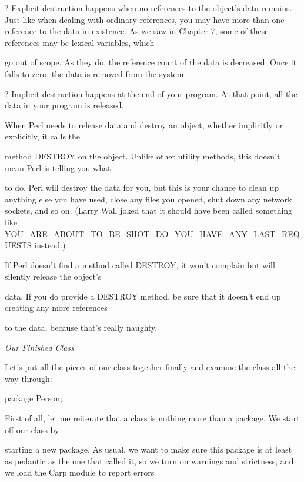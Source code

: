\documentclass[a4paper,11pt]{book}
\begin{document}
\noindent ? Explicit destruction happens when no references to the object's data remains. Just like when dealing with ordinary references, you may have more than one reference to the data in existence. As we saw in Chapter 7, some of these references may be lexical variables, which

\noindent go out of scope. As they do, the reference count of the data is decreased. Once it falls to zero, the data is removed from the system.

\noindent 

\noindent ? Implicit destruction happens at the end of your program. At that point, all the data in your program is released.

\noindent 

\noindent 

\noindent When Perl needs to release data and destroy an object, whether implicitly or explicitly, it calls the

\noindent method DESTROY on the object. Unlike other utility methods, this doesn't mean Perl is telling you what

\noindent to do. Perl will destroy the data for you, but this is your chance to clean up anything else you have used, close any files you opened, shut down any network sockets, and so on. (Larry Wall joked that it should have been called something like YOU\_ARE\_ABOUT\_TO\_BE\_SHOT\_DO\_YOU\_HAVE\_ANY\_LAST\_REQUESTS instead.)

\noindent 

\noindent If Perl doesn't find a method called DESTROY, it won't complain but will silently release the object's

\noindent data. If you do provide a DESTROY method, be sure that it doesn't end up creating any more references

\noindent to the data, because that's really naughty.

\noindent 

\noindent \textit{Our Finished Class}

\noindent Let's put all the pieces of our class together finally and examine the class all the way through:

\noindent 

\noindent package Person;

\noindent 

\noindent First of all,  let me  reiterate that  a  class  is  nothing  more  than  a  package.  We  start  off our class  by

\noindent starting a  new  package.  As usual,  we  want  to  make  sure  this  package  is  at  least  as  pedantic  as  the  one that called  it,  so  we turn on  warnings  and  strictness,  and  we  load  the Carp module  to  report  errors
\end{document}
